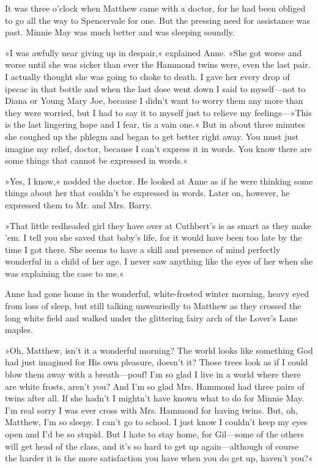 It was three o'clock when Matthew came with a doctor, for he had been obliged to go all the way to Spencervale for one. But the pressing need for assistance was past. Minnie May was much better and was sleeping soundly.

»I was awfully near giving up in despair,« explained Anne. »She got worse and worse until she was sicker than ever the Hammond twins were, even the last pair. I actually thought she was going to choke to death. I gave her every drop of ipecac in that bottle and when the last dose went down I said to myself—not to Diana or Young Mary Joe, because I didn't want to worry them any more than they were worried, but I had to say it to myself just to relieve my feelings—»This is the last lingering hope and I fear, tis a vain one.« But in about three minutes she coughed up the phlegm and began to get better right away. You must just imagine my relief, doctor, because I can't express it in words. You know there are some things that cannot be expressed in words.«

»Yes, I know,« nodded the doctor. He looked at Anne as if he were thinking some things about her that couldn't be expressed in words. Later on, however, he expressed them to Mr. and Mrs. Barry.

»That little redheaded girl they have over at Cuthbert's is as smart as they make 'em. I tell you she saved that baby's life, for it would have been too late by the time I got there. She seems to have a skill and presence of mind perfectly wonderful in a child of her age. I never saw anything like the eyes of her when she was explaining the case to me.«

Anne had gone home in the wonderful, white-frosted winter morning, heavy eyed from loss of sleep, but still talking unweariedly to Matthew as they crossed the long white field and walked under the glittering fairy arch of the Lover's Lane maples.

»Oh, Matthew, isn't it a wonderful morning? The world looks like something God had just imagined for His own pleasure, doesn't it? Those trees look as if I could blow them away with a breath—pouf! I'm so glad I live in a world where there are white frosts, aren't you? And I'm so glad Mrs. Hammond had three pairs of twins after all. If she hadn't I mightn't have known what to do for Minnie May. I'm real sorry I was ever cross with Mrs. Hammond for having twins. But, oh, Matthew, I'm so sleepy. I can't go to school. I just know I couldn't keep my eyes open and I'd be so stupid. But I hate to stay home, for Gil—some of the others will get head of the class, and it's so hard to get up again—although of course the harder it is the more satisfaction you have when you do get up, haven't you?«

